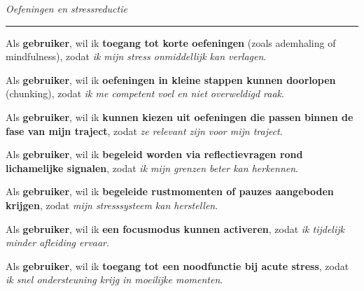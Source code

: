 \vspace{1em}
\vspace{1em}

\textit{Oefeningen en stressreductie}
\hrule
\vspace{1em}

Als \textbf{gebruiker}, \newline
wil ik \textbf{toegang tot korte oefeningen} (zoals ademhaling of mindfulness), \newline
zodat \textit{ik mijn stress onmiddellijk kan verlagen}.

\vspace{1em}

Als \textbf{gebruiker}, \newline
wil ik \textbf{oefeningen in kleine stappen kunnen doorlopen} (chunking), \newline
zodat \textit{ik me competent voel en niet overweldigd raak}.

\vspace{1em}

Als \textbf{gebruiker}, \newline
wil ik \textbf{kunnen kiezen uit oefeningen die passen binnen de fase van mijn traject}, \newline
zodat \textit{ze relevant zijn voor mijn traject}.

\vspace{1em}

Als \textbf{gebruiker}, \newline
wil ik \textbf{begeleid worden via reflectievragen rond lichamelijke signalen}, \newline
zodat \textit{ik mijn grenzen beter kan herkennen}.

\vspace{1em}

Als \textbf{gebruiker}, \newline
wil ik \textbf{begeleide rustmomenten of pauzes aangeboden krijgen}, \newline
zodat \textit{mijn stresssysteem kan herstellen}.

\vspace{1em}

Als \textbf{gebruiker}, \newline
wil ik \textbf{een focusmodus kunnen activeren}, \newline
zodat \textit{ik tijdelijk minder afleiding ervaar}.

\vspace{1em}

Als \textbf{gebruiker}, \newline
wil ik \textbf{toegang tot een noodfunctie bij acute stress}, \newline
zodat \textit{ik snel ondersteuning krijg in moeilijke momenten}.

